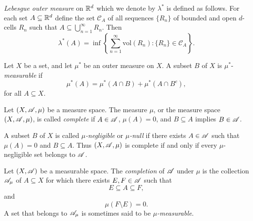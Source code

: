 \documentclass[12pt]{article}
\begin{document}
\begin{definition}
    \textit{Lebesgue outer measure} on $\mathbb{R}^d$ which we denote by $\lambda^*$ is defined as follows. For each set $A\subseteq\mathbb{R}^d$ define the set $\mathscr{C}_A$ of all sequences $\{R_n\}$ of bounded and open $d$-cells $R_n$ such that $A\subseteq \bigcup_{n=1}^\infty R_n$. Then 
    \begin{equation*}
        \lambda^*(A)=\inf \left\{\sum_{n=1}^\infty \text{vol}(R_n):\{R_n\}\in \mathscr{C}_A\right\}.
    \end{equation*}
\end{definition}
\begin{definition}
    Let $X$ be a set, and let $\mu^*$ be an outer measure on $X$. A subset $B$ of $X$ is $\mu^*$-\textit{measurable} if 
    \begin{equation*}
        \mu^*(A)=\mu^*(A\cap B)+\mu^*(A\cap B^c),
    \end{equation*}
    for all $A\subseteq X$.
\end{definition}
\begin{definition}
    Let $(X,\mathscr{A},\mu)$ be a measure space. The measure $\mu$, or the measure space $(X,\mathscr{A},\mu)$, is called \textit{complete} if $A\in\mathscr{A}$, $\mu(A)=0$, and $B\subseteq A$ implies $B\in\mathscr{A}$.
\end{definition}
\begin{definition}
    A subset $B$ of $X$ is called \textit{$\mu$-negligible} or \textit{$\mu$-null} if there exists $A\in\mathscr{A}$ such that $\mu(A)=0$ and $B\subseteq A$. Thus $(X,\mathscr{A},\mu)$ is complete if and only if every $\mu$-negligible set belongs to $\mathscr{A}$.
\end{definition}
\begin{definition}
    Let $(X,\mathscr{A})$ be a measurable space. The \textit{completion} of $\mathscr{A}$ under $\mu$ is the collection $\mathscr{A}_\mu$ of $A\subseteq X$ for which there exists $E,F\in\mathscr{A}$ such that
    \begin{equation*}
        E\subseteq A\subseteq F,
    \end{equation*}
    and 
    \begin{equation*}
        \mu(F\setminus E)=0.
    \end{equation*}
    A set that belongs to $\mathscr{A}_\mu$ is sometimes said to be \textit{$\mu$-measurable}.
\end{definition}
\end{document}
